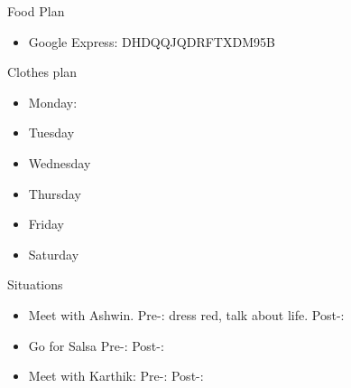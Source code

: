 \begin{columns}
    \begin{column}{0.20\linewidth}
      \begin{block}{Food Plan} 
        \begin{itemize}
          \tiny \item \tiny Google Express: DHDQQJQDRFTXDM95B
        \end{itemize}
      \end{block} 
      \begin{block}{Clothes plan} 
        \begin{itemize}
          \tiny \item \tiny Monday: 
        \item \tiny Tuesday
        \item \tiny Wednesday
        \item \tiny Thursday
        \item \tiny Friday
        \item \tiny Saturday
        \end{itemize} 
      \end{block} 
      
      \begin{block}{Situations}
        \begin{itemize}
          \tiny \item \tiny Meet with Ashwin. Pre-: dress red, talk
          about life. Post-:

          \tiny \item \tiny Go for Salsa Pre-:  Post-: 

        \item \tiny Meet with Karthik: Pre-:  Post-: 
        \end{itemize}
      \end{block}
    \end{column}
\end{columns}
